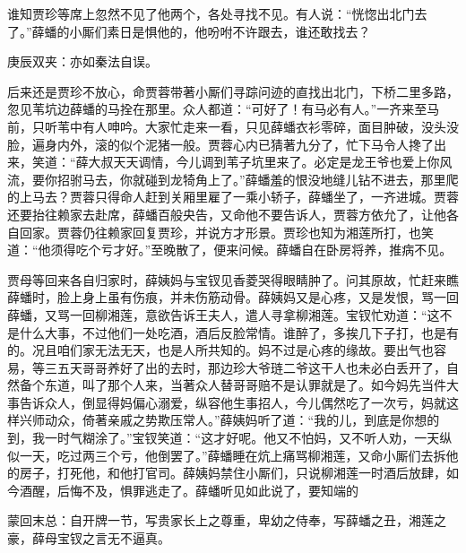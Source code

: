 \begin{parag}
    谁知贾珍等席上忽然不见了他两个，各处寻找不见。有人说：“恍惚出北门去了。”薛蟠的小厮们素日是惧他的，他吩咐不许跟去，谁还敢找去？\begin{note}庚辰双夹：亦如秦法自误。\end{note}后来还是贾珍不放心，命贾蓉带著小厮们寻踪问迹的直找出北门，下桥二里多路，忽见苇坑边薛蟠的马拴在那里。众人都道：“可好了！有马必有人。”一齐来至马前，只听苇中有人呻吟。大家忙走来一看，只见薛蟠衣衫零碎，面目肿破，没头没脸，遍身内外，滚的似个泥猪一般。贾蓉心内已猜著九分了，忙下马令人搀了出来，笑道：“薛大叔天天调情，今儿调到苇子坑里来了。必定是龙王爷也爱上你风流，要你招驸马去，你就碰到龙犄角上了。”薛蟠羞的恨没地缝儿钻不进去，那里爬的上马去？贾蓉只得命人赶到关厢里雇了一乘小轿子，薛蟠坐了，一齐进城。贾蓉还要抬往赖家去赴席，薛蟠百般央告，又命他不要告诉人，贾蓉方依允了，让他各自回家。贾蓉仍往赖家回复贾珍，并说方才形景。贾珍也知为湘莲所打，也笑道：“他须得吃个亏才好。”至晚散了，便来问候。薛蟠自在卧房将养，推病不见。
\end{parag}


\begin{parag}
    贾母等回来各自归家时，薛姨妈与宝钗见香菱哭得眼睛肿了。问其原故，忙赶来瞧薛蟠时，脸上身上虽有伤痕，并未伤筋动骨。薛姨妈又是心疼，又是发恨，骂一回薛蟠，又骂一回柳湘莲，意欲告诉王夫人，遣人寻拿柳湘莲。宝钗忙劝道：“这不是什么大事，不过他们一处吃酒，酒后反脸常情。谁醉了，多挨几下子打，也是有的。况且咱们家无法无天，也是人所共知的。妈不过是心疼的缘故。要出气也容易，等三五天哥哥养好了出的去时，那边珍大爷琏二爷这干人也未必白丢开了，自然备个东道，叫了那个人来，当著众人替哥哥赔不是认罪就是了。如今妈先当件大事告诉众人，倒显得妈偏心溺爱，纵容他生事招人，今儿偶然吃了一次亏，妈就这样兴师动众，倚著亲戚之势欺压常人。”薛姨妈听了道：“我的儿，到底是你想的到，我一时气糊涂了。”宝钗笑道：“这才好呢。他又不怕妈，又不听人劝，一天纵似一天，吃过两三个亏，他倒罢了。”薛蟠睡在炕上痛骂柳湘莲，又命小厮们去拆他的房子，打死他，和他打官司。薛姨妈禁住小厮们，只说柳湘莲一时酒后放肆，如今酒醒，后悔不及，惧罪逃走了。薛蟠听见如此说了，要知端的
\end{parag}


\begin{parag}
    \begin{note}蒙回末总：自开牌一节，写贵家长上之尊重，卑幼之侍奉，写薛蟠之丑，湘莲之豪，薛母宝钗之言无不逼真。\end{note}
\end{parag}

